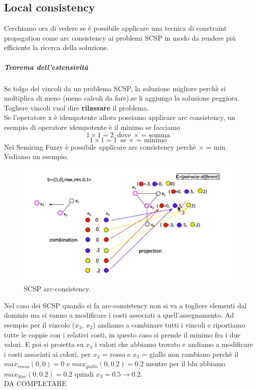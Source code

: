 \subsection{Local consistency}
Cerchiamo ora di vedere se è possibile applicare una tecnica di constraint propagation come arc consistency ai problemi SCSP in modo da rendere più efficiente la ricerca della soluzione. 
\subparagraph{Teorema dell'estensività} Se tolgo dei vincoli da un problema SCSP, la soluzione migliore perchè si moltiplica di meno (meno calcoli da fare),se li aggiungo la soluzione peggiora. Togliere vincoli vuol dire \textbf{rilassare} il problema.
\\
Se l'operatore x è idempotente allora possiamo applicare arc consistency, un esempio di operatore idempotente è il minimo se facciamo
\[1\times1= 2 \text{ dove $\times$ = somma}\]
\[1\times1= 1 \text{ se $\times$ = minimo}\]
Nei Semiring Fuzzy è possibile applicare arc consistency perchè $\times$ = min. Vediamo un esempio. 
\begin{figure}[H]
    \centering
    \includegraphics[width=12cm, keepaspectratio]{img/SCSP_arc_consistency.png}
    \caption{SCSP arc-consistency.}\label{fig:SCSP_arc_consistency}
\end{figure}
Nel caso dei SCSP quando si fa arc-consistency non si va a togliere elementi dal dominio ma si vanno a modificare i costi associati a quell'assegnamento. Ad esempio per il vincolo ($x_3$, $x_2$) andiamo a combinare tutti i vincoli e riportiamo tutte le coppie con i relativi costi, in questo caso si prende il minimo fra i due valori. E poi si proietta su $x_3$ i valori che abbiamo trovato e andiamo a modificare i costi associati ai colori, per $x_3$ = rosso e $x_3$ = giallo non cambiano perchè il $max_{rosso}(0,0) = 0$ e $max_{giallo}(0,0.2) = 0.2$ mentre per il blu abbiamo $max_{blue}(0,0.2) = 0.2$ quindi $x_3= 0.5 \xrightarrow{}0.2$.
\\
DA COMPLETARE 
\\
